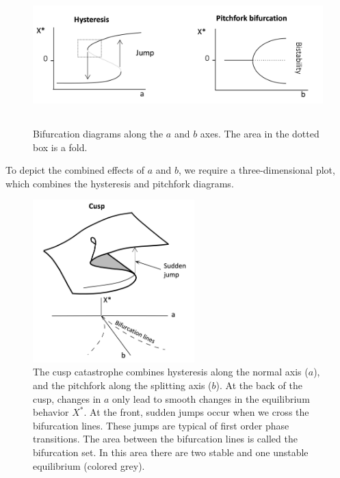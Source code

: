 \documentclass[
  letterpaper,
]{scrbook}
\begin{document}
\begin{figure}

{\centering \includegraphics[width=6.26389in,height=2.11806in]{media/ch3/image9.jpg}

}

\caption{\label{fig-ch3-img9-old-21}Bifurcation diagrams along the \(a\)
and \(b\) axes. The area in the dotted box is a fold.}

\end{figure}

To depict the combined effects of \(a\) and \(b\), we require a
three-dimensional plot, which combines the hysteresis and pitchfork
diagrams.

\begin{figure}

{\centering \includegraphics[width=2.46194in,height=2.47449in]{media/ch3/image10.jpg}

}

\caption{\label{fig-ch3-img10-old-22}The cusp catastrophe combines
hysteresis along the normal axis (\(a\)), and the pitchfork along the
splitting axis (\(b\)). At the back of the cusp, changes in \(a\) only
lead to smooth changes in the equilibrium behavior \(X^{*}\). At the
front, sudden jumps occur when we cross the bifurcation lines. These
jumps are typical of first order phase transitions. The area between the
bifurcation lines is called the bifurcation set. In this area there are
two stable and one unstable equilibrium (colored grey).}

\end{figure}
\end{document}
